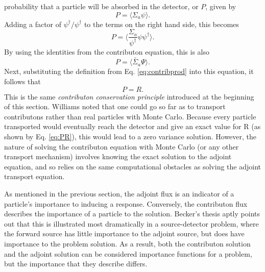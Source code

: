 probability that a particle will be absorbed in the detector, or $P$, given by
\begin{equation}
  P  = \langle \Sigma_a \psi \rangle.
\end{equation}
Adding a factor of $\psi^{\dagger}/\psi^{\dagger}$ to the terms on the right hand
side, this becomes
\begin{equation}
  P = \Big \langle \frac{\Sigma_a}{\psi^{\dagger}} \psi \psi^{\dagger} \Big
  \rangle.
\end{equation}
By using the identities from the contributon equation, this is also
\begin{equation}
  P = \langle \widetilde{\Sigma_a} \Psi \rangle .
\end{equation}
Next, substituting the definition from Eq. \eqref{eq:contribprod} into this
equation, it follows that
\begin{equation}
  P = R.
  \label{eq:PR}
\end{equation}
This is the same
\textit{contributon conservation principle} introduced at the beginning of this
section.
Williams noted that one could
go so far as to transport contributons rather than real particles with Monte Carlo.
Because every particle transported would eventually reach the detector and give
an exact value for R (as shown by Eq. \eqref{eq:PR}), this
would lead to a zero variance solution. However, the nature of solving the
contributon equation with Monte Carlo (or any other transport mechanism)
involves knowing the exact solution to the adjoint equation, and so relies on
the same computational obstacles as solving the adjoint transport equation.

As mentioned in the previous section, the adjoint flux is an indicator of a
particle's importance to inducing a response. Conversely, the contributon
flux describes the importance of a particle to the solution.
Becker's thesis \cite{becker_hybrid_2009} aptly points out that this is
illustrated most dramatically in a source-detector problem, where the forward
source has little importance to the adjoint source, but does have importance to
the problem solution. As a result, both the contributon solution and the adjoint
solution can be considered importance functions for a problem, but the
importance that they describe differs.

